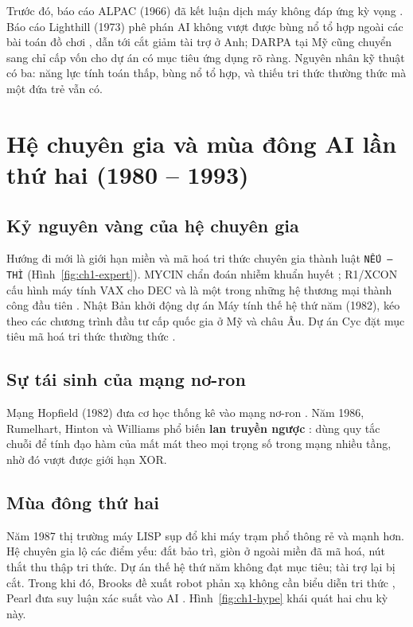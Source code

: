 
Trước đó, báo cáo ALPAC (1966) đã kết luận dịch máy không đáp ứng kỳ vọng \cite{ch1:alpac1966}. Báo cáo Lighthill (1973) phê phán AI
không vượt được bùng nổ tổ hợp ngoài các bài toán đồ chơi \cite{ch1:lighthill1973}, dẫn tới cắt giảm tài trợ ở Anh; DARPA tại Mỹ cũng
chuyển sang chỉ cấp vốn cho dự án có mục tiêu ứng dụng rõ ràng. Nguyên nhân kỹ thuật có ba: năng lực tính toán thấp, bùng nổ tổ hợp, và
thiếu tri thức thường thức mà một đứa trẻ vẫn có.

\section{Hệ chuyên gia và mùa đông AI lần thứ hai (1980 -- 1993)}
\subsection{Kỷ nguyên vàng của hệ chuyên gia}
Hướng đi mới là giới hạn miền và mã hoá tri thức chuyên gia thành luật \texttt{NẾU -- THÌ} (Hình~\ref{fig:ch1-expert}). MYCIN chẩn đoán
nhiễm khuẩn huyết \cite{ch1:shortliffe1976,ch1:buchanan1984}; R1/XCON cấu hình máy tính VAX cho DEC và là một trong những hệ thương mại
thành công đầu tiên \cite{ch1:mcdermott1982}. Nhật Bản khởi động dự án Máy tính thế hệ thứ năm (1982), kéo theo các chương trình đầu tư
cấp quốc gia ở Mỹ và châu Âu. Dự án Cyc đặt mục tiêu mã hoá tri thức thường thức \cite{ch1:lenat1995}.


\subsection{Sự tái sinh của mạng nơ-ron}
Mạng Hopfield (1982) đưa cơ học thống kê vào mạng nơ-ron \cite{ch1:hopfield1982}. Năm 1986, Rumelhart, Hinton và Williams phổ biến
\textbf{lan truyền ngược} \cite{ch1:rumelhart1986}: dùng quy tắc chuỗi để tính đạo hàm của mất mát theo mọi trọng số trong mạng nhiều
tầng, nhờ đó vượt được giới hạn XOR.

\subsection{Mùa đông thứ hai}
Năm 1987 thị trường máy LISP sụp đổ khi máy trạm phổ thông rẻ và mạnh hơn. Hệ chuyên gia lộ các điểm yếu: đắt bảo trì, giòn ở ngoài
miền đã mã hoá, nút thắt thu thập tri thức. Dự án thế hệ thứ năm không đạt mục tiêu; tài trợ lại bị cắt. Trong khi đó, Brooks đề xuất
robot phản xạ không cần biểu diễn tri thức \cite{ch1:brooks1991}, Pearl đưa suy luận xác suất vào AI \cite{ch1:pearl1988}.
Hình~\ref{fig:ch1-hype} khái quát hai chu kỳ này.

